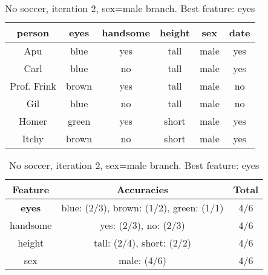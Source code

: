 \begin{table}[h!]
  \centering
  \begin{tabular}{ccccc|c}
    \toprule
    person      & eyes  & handsome & height & sex    & date\\
    \midrule
    Apu         & blue  & yes      & tall   & male   & yes \\
    Carl        & blue  & no       & tall   & male   & yes \\
    Prof. Frink & brown & yes      & tall   & male   & no  \\
    Gil         & blue  & no       & tall   & male   & no  \\
    Homer       & green & yes      & short  & male   & yes \\
    Itchy       & brown & no       & short  & male   & yes \\
    \bottomrule
  \end{tabular}

  \vspace{.5cm}

  \begin{tabular}{ccc}
    \toprule
    Feature       & Accuracies                              & Total\\
    \midrule
    \textbf{eyes} & blue: (2/3), brown: (1/2), green: (1/1) & 4/6\\
    handsome      & yes: (2/3), no: (2/3)                   & 4/6\\
    height        & tall: (2/4), short: (2/2)               & 4/6\\
    sex           & male: (4/6)                             & 4/6\\
    \bottomrule
  \end{tabular}
  \caption*{No soccer, iteration 2, sex=male branch. Best feature: eyes}
\end{table}

